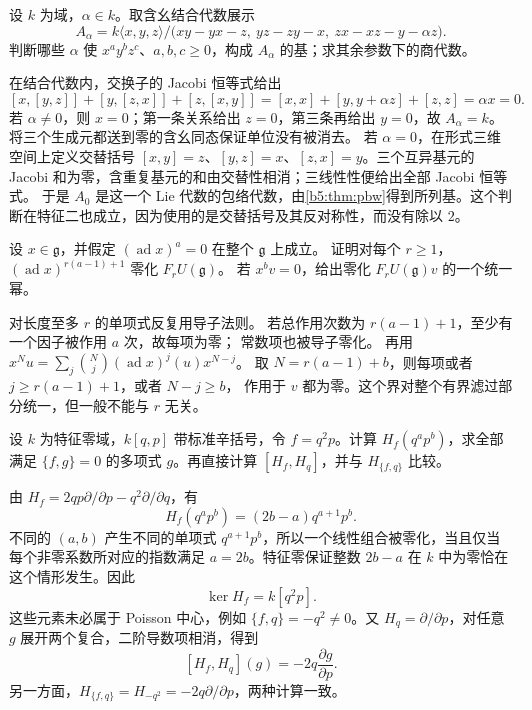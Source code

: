 \begin{exercise}\label{b5:ex:15-failed-jacobi-presentation}
	设 \(k\) 为域，\(\alpha\in k\)。取含幺结合代数展示
	\[
		A_\alpha=k\langle x,y,z\rangle/ \bigl(xy-yx-z,\ yz-zy-x,\ zx-xz-y-\alpha z\bigr).
	\]
	判断哪些 \(\alpha\) 使 \(x^ay^bz^c\)、\(a,b,c\ge0\)，构成 \(A_\alpha\) 的基；求其余参数下的商代数。
\end{exercise}
\begin{solution}
	在结合代数内，交换子的 Jacobi 恒等式给出
	\[
		[x,[y,z]]+[y,[z,x]]+[z,[x,y]] =[x,x]+[y,y+\alpha z]+[z,z]=\alpha x=0.
	\]
	若 \(\alpha\ne0\)，则 \(x=0\)；第一条关系给出 \(z=0\)，第三条再给出 \(y=0\)，故 \(A_\alpha=k\)。将三个生成元都送到零的含幺同态保证单位没有被消去。 若 \(\alpha=0\)，在形式三维空间上定义交替括号 \([x,y]=z\)、\([y,z]=x\)、\([z,x]=y\)。三个互异基元的 Jacobi 和为零，含重复基元的和由交替性相消；三线性性便给出全部 Jacobi 恒等式。 于是 \(A_0\) 是这一个 Lie 代数的包络代数，由\cref{b5:thm:pbw}得到所列基。这个判断在特征二也成立，因为使用的是交替括号及其反对称性，而没有除以 \(2\)。
\end{solution}

\begin{exercise}\label{b5:ex:15-adjoint-nilpotence-degree}
	设 \(x\in\mathfrak g\)，并假定 \((\operatorname{ad}x)^a=0\) 在整个 \(\mathfrak g\) 上成立。 证明对每个 \(r\ge1\)，\((\operatorname{ad}x)^{r(a-1)+1}\) 零化 \(F_rU(\mathfrak g)\)。 若 \(x^bv=0\)，给出零化 \(F_rU(\mathfrak g)v\) 的一个统一幂。
\end{exercise}
\begin{solution}
	对长度至多 \(r\) 的单项式反复用导子法则。 若总作用次数为 \(r(a-1)+1\)，至少有一个因子被作用 \(a\) 次，故每项为零； 常数项也被导子零化。 再用 \(x^Nu=\sum_j\binom Nj(\operatorname{ad}x)^j(u)x^{N-j}\)。 取 \(N=r(a-1)+b\)，则每项或者 \(j\ge r(a-1)+1\)，或者 \(N-j\ge b\)， 作用于 \(v\) 都为零。这个界对整个有界滤过部分统一，但一般不能与 \(r\) 无关。
\end{solution}

\begin{exercise}\label{b5:ex:15-hamilton-polynomial-invariants}
	设 \(k\) 为特征零域，\(k[q,p]\) 带标准辛括号，令 \(f=q^2p\)。计算 \(H_f(q^ap^b)\)，求全部满足 \(\{f,g\}=0\) 的多项式 \(g\)。再直接计算 \([H_f,H_q]\)，并与 \(H_{\{f,q\}}\) 比较。
\end{exercise}
\begin{solution}
	由 \(H_f=2qp\partial/\partial p-q^2\partial/\partial q\)，有
	\[
		H_f(q^ap^b)=(2b-a)q^{a+1}p^b.
	\]
	不同的 \((a,b)\) 产生不同的单项式 \(q^{a+1}p^b\)，所以一个线性组合被零化，当且仅当每个非零系数所对应的指数满足 \(a=2b\)。特征零保证整数 \(2b-a\) 在 \(k\) 中为零恰在这个情形发生。因此
	\[
		\ker H_f=k[q^2p].
	\]
	这些元素未必属于 Poisson 中心，例如 \(\{f,q\}=-q^2\ne0\)。又 \(H_q=\partial/\partial p\)，对任意 \(g\) 展开两个复合，二阶导数项相消，得到
	\[
		[H_f,H_q](g)=-2q\frac{\partial g}{\partial p}.
	\]
	另一方面，\(H_{\{f,q\}}=H_{-q^2}=-2q\partial/\partial p\)，两种计算一致。
\end{solution}

